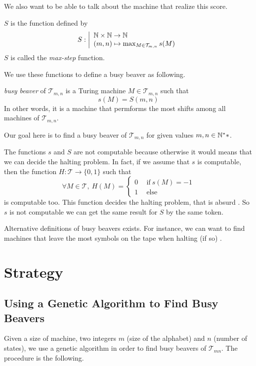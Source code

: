 \documentclass{report}
\begin{document}
We also want to be able to talk about the machine that realize this score.
\begin{Def}
$S$ is the function defined by
\[
S : \left |
  \begin{array}{l}
    \mathbb{N} \times \mathbb{N} \to \mathbb{N}\\
    (m,n) \mapsto \max_{M \in \mathcal{T}_{m,n}} s(M)
  \end{array}
\right .
\]
$S$ is called the \emph{max-step} function.
\end{Def}

We use these functions to define a busy beaver as following.

\begin{Def}
\emph{busy beaver} of $\mathcal{T}_{m,n}$ is a Turing machine $M \in \mathcal{T}_{m,n}$ such that \[s(M) = S(m,n)\] In other words, it is a machine that permforms the most shifts among all machines of $\mathcal{T}_{m,n}$. 
\end{Def}


Our goal here is to find a busy beaver of $\mathcal{T}_{m,n}$ for given values $m,n\in\mathbb{N}^**$.


\begin{Rem}
  The functions $s$ and $S$ are not computable because otherwise it would means that we can decide the halting problem. In fact, if we assume that $s$ is computable, then the function $H : \mathcal{T} \to \{0,1\}$ such that
  \[
  \forall M \in \mathcal{T},\ H(M) =
  \left \{
    \begin{array}{l}
      0\quad \ \text{if}\ s(M) = -1\\
      1\quad \ \text{else}
    \end{array}
  \right .
  \]
  is computable too. This function decides the halting problem, that is absurd \cite{turing}. So $s$ is not computable we can get the same result for $S$ by the same token.
\end{Rem}

\begin{Rem}
  Alternative definitions of busy beavers exists. For instance, we can want to find machines that leave the most symbols on the tape when halting (if so) \cite{rado}.
\end{Rem}

\chapter{Strategy}
\label{chap:strategy}

\section{Using a Genetic Algorithm to Find Busy Beavers}
\label{sec:genalg}
Given a size of machine, \ie two integers $m$ (size of the alphabet) and $n$ (number of states), we use a genetic algorithm in order to find busy beavers of $\mathcal{T}_{mn}$. The procedure is the following.
\end{document}
